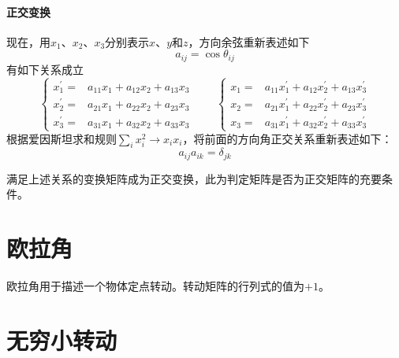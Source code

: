 \paragraph*{正交变换}
现在，用$x_1$、$x_2$、$x_3$分别表示$x$、$y$和$z$，方向余弦重新表述如下
\begin{equation}
	a_{ij} = \cos{\theta_{ij}}
\end{equation}
有如下关系成立
\begin{equation}
	\left\{\begin{aligned}
	x_1^{\prime} =& a_{11}x_1 + a_{12}x_2 + a_{13}x_3 \\
	x_2^{\prime} =& a_{21}x_1 + a_{22}x_2 + a_{23}x_3 \\
	x_3^{\prime} =& a_{31}x_1 + a_{32}x_2 + a_{33}x_3
	\end{aligned}\right. \qquad
	\left\{\begin{aligned}
		x_1 =& a_{11}x_1^{\prime} + a_{12}x_2^{\prime} + a_{13}x_3^{\prime} \\
		x_2 =& a_{21}x_1^{\prime} + a_{22}x_2^{\prime} + a_{23}x_3^{\prime} \\
		x_3 =& a_{31}x_1^{\prime} + a_{32}x_2^{\prime} + a_{33}x_3^{\prime}
	\end{aligned}\right.
\end{equation}
根据爱因斯坦求和规则$\sum_{i}x_i^2 \rightarrow x_i x_i$，将前面的方向角正交关系重新表述如下：
\begin{equation}
	a_{ij} a_{ik} = \delta_{jk}
\end{equation}
\begin{note}
	满足上述关系的变换矩阵成为正交变换，此为判定矩阵是否为正交矩阵的充要条件。
\end{note}

\section{欧拉角}
欧拉角用于描述一个物体定点转动。转动矩阵的行列式的值为$+1$。

\section{无穷小转动}
